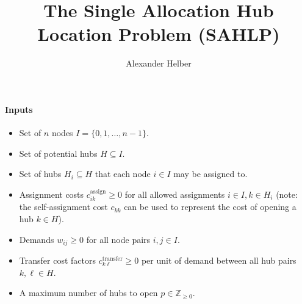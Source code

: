 \documentclass{article}
\begin{document}
\title{The Single Allocation Hub Location Problem (SAHLP)}
\date{}
\author{Alexander Helber}
\maketitle
\paragraph{Inputs}
\begin{itemize}
    \item Set of \(n\) nodes \(I = \{0, 1, \dots, n -1\}\).
    \item Set of potential hubs \(H \subseteq I\).
    \item Set of hubs \(H_i \subseteq H\) that each node \(i \in I\) may be assigned to.
    \item Assignment costs \(c^\mathrm{assign}_{ik} \geq 0\) for all allowed assignments \(i \in I, k \in H_i\) (note: the self-assignment cost \(c_{kk}\) can be used to represent the cost of opening a hub \(k \in H\)).
    \item Demands \(w_{ij} \geq 0\) for all node pairs \(i, j \in I\).
    \item Transfer cost factors \(c^\mathrm{transfer}_{k\ell} \geq 0\) per unit of demand between all hub pairs \(k, \ell \in H\).
    \item A maximum number of hubs to open \(p \in \mathbb{Z}_{\geq 0}\).
\end{itemize}
\end{document}
